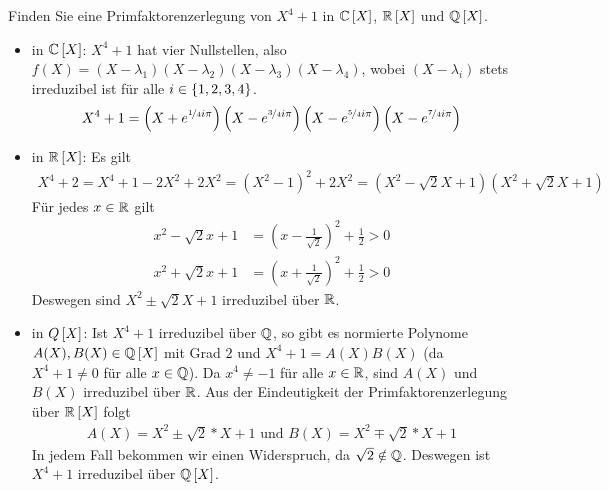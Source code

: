 \begin{exercisePage}
\pagebreak
    
    \begin{exercise}[Präsenz]
        Finden Sie eine Primfaktorenzerlegung von $X^4+1$ in $\mathbb{C} \left[ X \right]$, $\mathbb{R} \left[ X \right]$ und $\mathbb{Q} \left[ X \right]$.
    \end{exercise}
    \begin{solution}
        \begin{itemize}[leftmargin=*]
            \item in $\mathbb{C} \left[ X \right]$: $X^4 + 1$ hat vier Nullstellen, also $f(X) = (X - \lambda_1)(X - \lambda_2)(X - \lambda_3)(X - \lambda_4)$, wobei $(X - \lambda_i)$ stets irreduzibel ist für alle $i \in \left\{ 1,2,3,4 \right\}$.
            \begin{align*}
                X^4 + 1 = \left( X + e^{\lfrac{1}{4} i \pi} \right)	
                          \left( X - e^{\lfrac{3}{4} i \pi} \right)
                          \left( X - e^{\lfrac{5}{4} i \pi} \right)
                          \left( X - e^{\lfrac{7}{4} i \pi} \right)
            \end{align*}
            \item in $\mathbb{R} \left[ X \right]$: Es gilt
            \begin{align*}
                X^4 + 2 =  X^4 + 1 - 2X^2 + 2X^2 = (X^2 - 1)^2 + 2X^2 = \left( X^2 - \sqrt{2} X + 1 \right) \left( X^2 + \sqrt{2} X + 1 \right)
            \end{align*}
            Für jedes $x \in \mathbb{R}$ gilt
            \begin{align*}
                x^2 - \sqrt{2} x + 1 &= \left( x - \frac{1}{\sqrt{2}} \right)^2 + \frac{1}{2} > 0 \\
                x^2 + \sqrt{2} x + 1 &= \left( x + \frac{1}{\sqrt{2}} \right)^2 + \frac{1}{2} > 0 
            \end{align*}
            Deswegen sind $X^2 \pm \sqrt{2} X + 1$ irreduzibel über $\mathbb{R}$.
            \item in $Q \left[ X \right]$: Ist $X^4 + 1$ irreduzibel über $\mathbb{Q}$, so gibt es normierte Polynome $A(X), B(X) \in \mathbb{Q} \left[ X \right]$ mit Grad $2$ und $X^4 + 1 = A(X) B(X)$ (da $X^4+1 \neq 0$ für alle $x \in \mathbb{Q}$). Da $x^4 \neq - 1$ für alle $x \in \mathbb{R}$, sind $A(X)$ und $B(X)$ irreduzibel über $\mathbb{R}$. Aus der Eindeutigkeit der Primfaktorenzerlegung über $\mathbb{R} \left[ X \right]$ folgt
            \begin{align*}
                A(X) = X^2 \pm \sqrt{2} * X + 1 \text{ und } B(X) = X^2 \mp \sqrt{2} * X + 1
            \end{align*}
            In jedem Fall bekommen wir einen Widerspruch, da $\sqrt{2} \notin \mathbb{Q}$. Deswegen ist $X^4 + 1$ irreduzibel über $\mathbb{Q} \left[ X \right]$.
        \end{itemize}
    \end{solution}

\end{exercisePage}